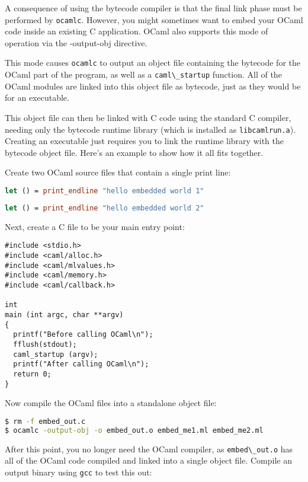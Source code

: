 A consequence of using the bytecode compiler is that the final link
phase must be performed by \passthrough{\lstinline!ocamlc!}. However,
you might sometimes want to embed your OCaml code inside an existing C
application. OCaml also supports this mode of operation via the
{-output-obj} directive.

This mode causes \passthrough{\lstinline!ocamlc!} to output an object
file containing the bytecode for the OCaml part of the program, as well
as a \passthrough{\lstinline!caml\_startup!} function. All of the OCaml
modules are linked into this object file as bytecode, just as they would
be for an executable.

This object file can then be linked with C code using the standard C
compiler, needing only the bytecode runtime library (which is installed
as \passthrough{\lstinline!libcamlrun.a!}). Creating an executable just
requires you to link the runtime library with the bytecode object file.
Here's an example to show how it all fits together.

Create two OCaml source files that contain a single print line:

\begin{lstlisting}[language=Caml]
let () = print_endline "hello embedded world 1"
\end{lstlisting}

\begin{lstlisting}[language=Caml]
let () = print_endline "hello embedded world 2"
\end{lstlisting}

Next, create a C file to be your main entry point:

\begin{lstlisting}
#include <stdio.h>
#include <caml/alloc.h>
#include <caml/mlvalues.h>
#include <caml/memory.h>
#include <caml/callback.h>

int
main (int argc, char **argv)
{
  printf("Before calling OCaml\n");
  fflush(stdout);
  caml_startup (argv);
  printf("After calling OCaml\n");
  return 0;
}
\end{lstlisting}

Now compile the OCaml files into a standalone object file:

\begin{lstlisting}[language=bash]
$ rm -f embed_out.c
$ ocamlc -output-obj -o embed_out.o embed_me1.ml embed_me2.ml
\end{lstlisting}

After this point, you no longer need the OCaml compiler, as
\passthrough{\lstinline!embed\_out.o!} has all of the OCaml code
compiled and linked into a single object file. Compile an output binary
using \passthrough{\lstinline!gcc!} to test this out:

